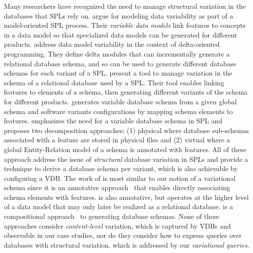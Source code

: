 Many researchers have recognized the need to manage structural variation in the
databases that SPLs rely on.
%
\citet{ad11varDataModel} argue for modeling data variability as part of a
model-oriented SPL process. Their \emph{variable data models}
link features to concepts in a data model so that specialized data models can
be generated for different products.
%
\citet{dbSchVarSPL} address data model variability in the context of
delta-oriented programming. They define delta modules that can incrementally
generate a relational database schema, and so
can be used to generate different database schemas for each variant of a SPL.
%
\citet{varMngDBapp} present a tool to manage variation in the schema
of a relational database used by a SPL. Their tool enables
linking features to elements of a schema, then generating different variants of
the schema for different products.
%
\citet{slrs12CAiSE} generates variable database schema from a given global schema and
software variants configurations by mapping schema elements to features.
%
\citet{skrhas09DBIS} emphasizes the need for a variable database schema in SPL and
proposes two decomposition approaches: (1) physical where database sub-schemas
associated with a feature are stored in physical files
and (2) virtual where a global Entity-Relation model of a schema is annotated
with features.
%
All of these approach address the issue of \emph{structural} database variation
in SPLs and provide a technique to derive a database schema per variant, 
which is also achievable by configuring a VDB. 
%
The work of \citet{varMngDBapp} is most similar to our notion of a
variational schema since it is an annotative approach~\cite{KAK08} that enables
directly associating schema elements with features. \citet{ad11varDataModel}
is also annotative, but operates at the higher level of a data model that may
only later be realized as a relational database. \citet{dbSchVarSPL} is a
compositional approach~\cite{KAK08} to generating database schemas.
%
None of these approaches consider \emph{content-level} variation, which is
captured by VDBs and observable in our case studies, nor do they consider how
to express queries over databases with structural variation, which is addressed
by our \emph{variational queries}.


